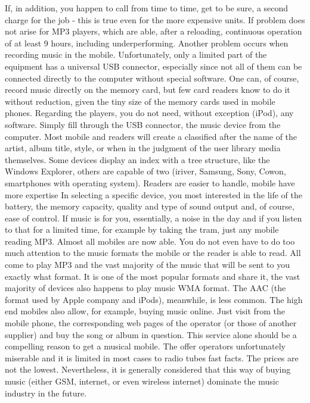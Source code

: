 If, in addition, you happen to call from time to time, get to be sure, a second charge for the job - this is true even for the more expensive units.
If problem does not arise for MP3 players, which are able, after a reloading, continuous operation of at least 9 hours, including underperforming.
Another problem occurs when recording music in the mobile.
Unfortunately, only a limited part of the equipment has a universal USB connector, especially since not all of them can be connected directly to the computer without special software.
One can, of course, record music directly on the memory card, but few card readers know to do it without reduction, given the tiny size of the memory cards used in mobile phones.
Regarding the players, you do not need, without exception (iPod), any software.
Simply fill through the USB connector, the music device from the computer.
Most mobile and readers will create a classified after the name of the artist, album title, style, or when in the judgment of the user library media themselves.
Some devices display an index with a tree structure, like the Windows Explorer, others are capable of two (iriver, Samsung, Sony, Cowon, smartphones with operating system).
Readers are easier to handle, mobile have more expertise
In selecting a specific device, you most interested in the life of the battery, the memory capacity, quality and type of sound output and, of course, ease of control.
If music is for you, essentially, a noise in the day and if you listen to that for a limited time, for example by taking the tram, just any mobile reading MP3.
Almost all mobiles are now able.
You do not even have to do too much attention to the music formats the mobile or the reader is able to read.
All come to play MP3 and the vast majority of the music that will be sent to you exactly what format.
It is one of the most popular formats and share it, the vast majority of devices also happens to play music WMA format.
The AAC (the format used by Apple company and iPods), meanwhile, is less common.
The high end mobiles also allow, for example, buying music online.
Just visit from the mobile phone, the corresponding web pages of the operator (or those of another supplier) and buy the song or album in question.
This service alone should be a compelling reason to get a musical mobile.
The offer operators unfortunately miserable and it is limited in most cases to radio tubes fast facts.
The prices are not the lowest.
Nevertheless, it is generally considered that this way of buying music (either GSM, internet, or even wireless internet) dominate the music industry in the future.
